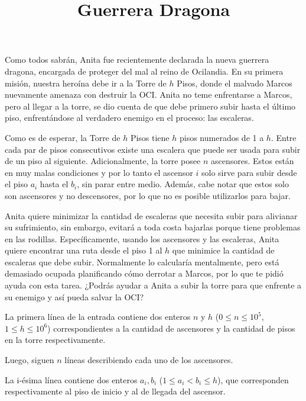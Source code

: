 \documentclass{oci}
\title{Guerrera Dragona}
\begin{document}
\begin{problemDescription}
  Como todos sabrán, Anita fue recientemente
  declarada la nueva guerrera dragona, encargada
  de proteger del mal al reino de Ocilandia.
  En su primera misión, nuestra heroína debe ir
  a la Torre de $h$ Pisos, donde el malvado
  Marcos nuevamente amenaza con destruir la OCI.
  Anita no teme enfrentarse a Marcos, pero al llegar a
  la torre, se dio cuenta de que debe primero subir
  hasta el último piso, enfrentándose al verdadero enemigo
  en el proceso: las escaleras.


  Como es de esperar, la Torre de $h$ Pisos tiene $h$ pisos
  numerados de 1 a $h$.
  Entre cada par de pisos consecutivos existe una
  escalera que puede ser usada para subir de un piso al
  siguiente.
  Adicionalmente, la torre posee $n$ ascensores.
  Estos están en muy malas condiciones y por lo tanto el
  ascensor $i$ solo sirve para subir desde el piso $a_i$ hasta el
  $b_i$, sin parar entre medio.
  Además, cabe notar que estos solo son ascensores y no descensores,
  por lo que no es posible utilizarlos para bajar.

  Anita quiere minimizar la cantidad de escaleras que
  necesita subir para alivianar su sufrimiento, sin embargo,
  evitará a toda costa bajarlas porque tiene
  problemas en las rodillas.
  Específicamente, usando los ascensores y las escaleras,
  Anita quiere encontrar una ruta desde el piso 1 al $h$ que
  minimice la cantidad de escaleras que debe subir.
  Normalmente lo calcularía mentalmente, pero está demasiado
  ocupada planificando cómo derrotar a Marcos, por lo que
  te pidió ayuda con esta tarea.
  ¿Podrás ayudar a Anita a subir la torre para
  que enfrente a su enemigo y así pueda salvar la OCI?
\end{problemDescription}

\begin{inputDescription}
  La primera línea de la entrada contiene dos enteros
  $n$ y $h$ ($0 \leq n \leq 10^5$, $1 \leq h \leq 10^6$)
  correspondientes a la cantidad de ascensores y la cantidad
  de pisos en la torre respectivamente.

  Luego, siguen $n$ líneas describiendo cada uno de los ascensores.

  La i-ésima línea contiene dos enteros $a_i, b_i$
  ($1 \leq a_i < b_i \leq h$), que corresponden respectivamente
  al piso de inicio y al de llegada del ascensor.
\end{inputDescription}
\end{document}
